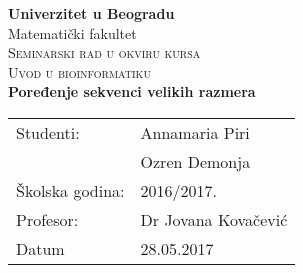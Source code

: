 \documentclass[a4paper,12pt]{report}
\begin{document}
\renewcommand*\contentsname{ }

\begin{titlepage}
\begin{center}

	\textbf{\Large Univerzitet u Beogradu}\\[0.5cm]
	
	{\large Matematički fakultet}\\[6cm]
	
	\textsc{\small Seminarski rad u okviru kursa\\Uvod u bioinformatiku}\\[0.5cm]
	
	
	\textbf{\Large Poređenje sekvenci velikih razmera}\\[10cm]

	\begin{tabular}{|l|l|}
  		\hline
	    Studenti: & Annamaria Piri \\ \cline{2-2}
	              & Ozren Demonja \\ \hline
	    Školska godina: & 2016/2017. \\ \hline
	    Profesor: & Dr Jovana Kovačević	 \\ \hline
	    Datum &  28.05.2017 \\ \hline
	\end{tabular}

\newpage
\end{center}
\end{titlepage}







\newpage



%

%
\end{document}
